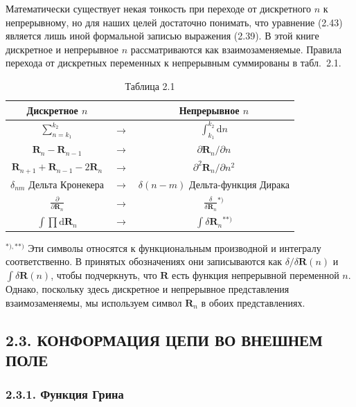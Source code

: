 \documentclass[12pt,a4paper]{article}
\begin{document}
Математически существует некая тонкость при переходе от дискретного $n$ к непрерывному, но для наших целей достаточно понимать, что уравнение (2.43) является лишь иной формальной записью выражения (2.39). В этой книге дискретное и непрерывное $n$ рассматриваются как взаимозаменяемые. Правила перехода от дискретных переменных к непрерывным суммированы в табл.~2.1.

\begin{table}[h!]
\centering
\caption*{Таблица 2.1}
\begin{tabular}{ccc}
\toprule
Дискретное $n$ & & Непрерывное $n$ \\
\midrule
$\displaystyle\sum_{n=k_1}^{k_2}$ & $\to$ & $\displaystyle\int_{k_1}^{k_2}\!\mathrm{d}n$ \\
$\boldsymbol{R}_n - \boldsymbol{R}_{n-1}$ & $\to$ & $\partial\boldsymbol{R}_n/\partial n$ \\
$\boldsymbol{R}_{n+1} + \boldsymbol{R}_{n-1} - 2\boldsymbol{R}_n$ & $\to$ & $\partial^2\boldsymbol{R}_n/\partial n^2$ \\
$\delta_{nm}$ Дельта Кронекера & $\to$ & $\delta(n - m)$ Дельта-функция Дирака \\
$\displaystyle\frac{\partial}{\partial\boldsymbol{R}_n}$ & $\to$ & $\displaystyle\frac{\delta}{\delta\boldsymbol{R}_n}{}^{*)}$ \\
$\displaystyle\int\prod\mathrm{d}\boldsymbol{R}_n$ & $\to$ & $\displaystyle\int\!\delta\boldsymbol{R}_n{}^{**)}$ \\
\bottomrule
\end{tabular}
\end{table}
\noindent\footnotesize{${}^{*), **)}$ Эти символы относятся к функциональным производной и интегралу соответственно. В принятых обозначениях они записываются как $\delta/\delta\boldsymbol{R}(n)$ и $\int\!\delta\boldsymbol{R}(n)$, чтобы подчеркнуть, что $\boldsymbol{R}$ есть функция непрерывной переменной $n$. Однако, поскольку здесь дискретное и непрерывное представления взаимозаменяемы, мы используем символ $\boldsymbol{R}_n$ в обоих представлениях.}

\normalsize

\subsection*{2.3. КОНФОРМАЦИЯ ЦЕПИ ВО ВНЕШНЕМ ПОЛЕ}

\subsubsection*{2.3.1. Функция Грина}
\end{document}
